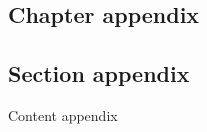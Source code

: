 \begin{appendices}
\chapter{Chapter appendix}

\section{Section appendix}

Content appendix

\end{appendices}

